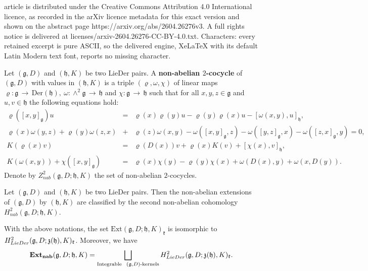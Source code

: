 \documentclass[10pt,a4paper]{amsart}
\newcommand{\Der}{\mathrm{Der}}
\newcommand{\LD}{{\rm LieDer }}
\newcommand{\frkk}{\mathfrak k}
\newcommand{\frkz}{\mathfrak z}
\newcommand{\g}{\mathfrak g}
\newcommand{\h}{\mathfrak h}
\newcommand{\lon }{\,\rightarrow\,}
\begin{document}
article is distributed under the Creative Commons Attribution 4.0 International licence, as recorded in the arXiv licence metadata for this exact version and shown on the abstract page https://arxiv.org/abs/2604.26276v3. A full rights notice is delivered at licenses/arxiv-2604.26276-CC-BY-4.0.txt. Characters: every retained excerpt is pure ASCII, so the delivered engine, XeLaTeX with its default Latin Modern text font, reports no missing character.
\begin{defi}
Let $(\g, D)$ and $(\h, K)$ be two {\rm LieDer} pairs. A {\bf non-abelian $2$-cocycle} of $(\g, D)$ with values in $(\h, K)$ is a triple $(\varrho, \omega, \chi)$ of linear maps $\varrho: \g\lon\Der(\h),~\omega:\wedge^2\g\lon\h$ and $\chi:\g\lon\h$ such that for all $x, y, z\in\g$ and $u, v\in\h$ the following equations hold:
\begin{eqnarray}
\label{nc1}\varrho([x, y]_\g)u&=&\varrho(x)\varrho(y)u-\varrho(y)\varrho(x)u-[\omega(x, y), u]_\h,\\
\label{nc2}\varrho(x)\omega(y, z)+\varrho(y)\omega(z, x)&+&\varrho(z)\omega(x, y)-\omega([x, y]_\g, z)-\omega([y, z]_\g, x)-\omega([z, x]_\g, y)=0,\\
\label{nc3}K(\varrho(x)v)&=&\varrho(D(x))v+\varrho(x)K(v)+[\chi(x), v]_\h,\\
\label{nc4}K(\omega(x, y))+\chi([x, y]_\g)&=&\varrho(x)\chi(y)-\varrho(y)\chi(x)+\omega(D(x), y)+\omega(x, D(y)).
\end{eqnarray}
Denote by $Z^2_{nab}(\g, D;\h, K)$ the set of non-abelian $2$-cocycles.
\end{defi}

\begin{thm}\label{corres}
Let $(\g, D)$ and $(\h, K)$ be two {\rm LieDer} pairs. Then the non-abelian extensions of $(\g, D)$ by $(\h, K)$ are classified by the second non-abelian cohomology $H_{nab}^2
(\g, D; \h, K)$.
\end{thm}

\begin{thm}\label{gdk}
With the above notations, the set $\mathrm{Ext}(\g,D;\h,K)_{\frkk}$ is isomorphic to $H^2_{\LD}(\g,D;\frkz(\h),K)_{\frkk}$. Moreover, we have 
    \begin{equation*}
      {\rm{\bf Ext_{nab}}}(\g,D;\h,K)=\bigsqcup_{\text{Integrable}~~(\g,D)\text{-kernels}}H^2_{\LD}(\g,D; \frkz(\h), K)_{\frkk}.
    \end{equation*}
    \end{thm}
\end{document}
